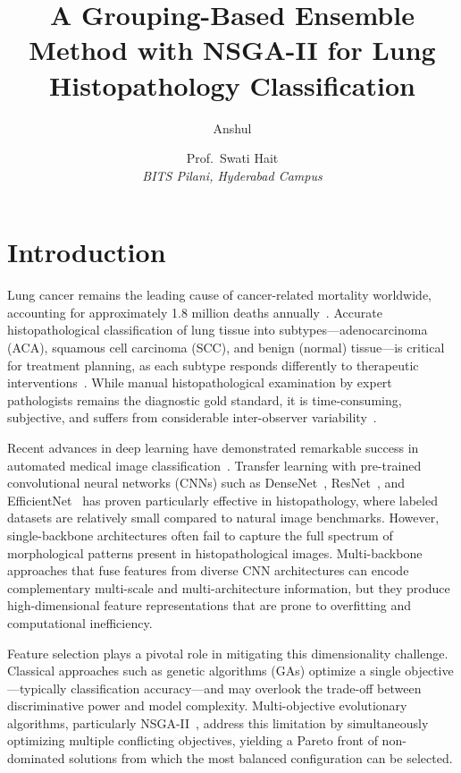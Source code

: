 \documentclass{article}
\title{A Grouping-Based Ensemble Method with NSGA-II for Lung Histopathology Classification}
\author{Anshul \and Prof.\ Swati Hait\\
\textit{BITS Pilani, Hyderabad Campus}}
\date{}
\begin{document}
\maketitle

\section{Introduction}

Lung cancer remains the leading cause of cancer-related mortality worldwide, accounting for approximately 1.8 million deaths annually~\cite{who2024cancer}. Accurate histopathological classification of lung tissue into subtypes---adenocarcinoma (ACA), squamous cell carcinoma (SCC), and benign (normal) tissue---is critical for treatment planning, as each subtype responds differently to therapeutic interventions~\cite{travis2015who}. While manual histopathological examination by expert pathologists remains the diagnostic gold standard, it is time-consuming, subjective, and suffers from considerable inter-observer variability~\cite{robbins2023pathology}.

Recent advances in deep learning have demonstrated remarkable success in automated medical image classification~\cite{litjens2017survey}. Transfer learning with pre-trained convolutional neural networks (CNNs) such as DenseNet~\cite{huang2017densely}, ResNet~\cite{he2016deep}, and EfficientNet~\cite{tan2019efficientnet} has proven particularly effective in histopathology, where labeled datasets are relatively small compared to natural image benchmarks. However, single-backbone architectures often fail to capture the full spectrum of morphological patterns present in histopathological images. Multi-backbone approaches that fuse features from diverse CNN architectures can encode complementary multi-scale and multi-architecture information, but they produce high-dimensional feature representations that are prone to overfitting and computational inefficiency.

Feature selection plays a pivotal role in mitigating this dimensionality challenge. Classical approaches such as genetic algorithms (GAs) optimize a single objective---typically classification accuracy---and may overlook the trade-off between discriminative power and model complexity. Multi-objective evolutionary algorithms, particularly NSGA-II~\cite{deb2002fast}, address this limitation by simultaneously optimizing multiple conflicting objectives, yielding a Pareto front of non-dominated solutions from which the most balanced configuration can be selected.
\end{document}
